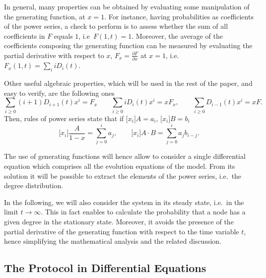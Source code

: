 \documentclass[a4paper,twosided]{article}
\begin{document}
In general, many properties can be obtained by evaluating some manipulation of the generating function, at $x=1$. For instance, having probabilities as coefficients of the power series, a check to perform is to assess whether the sum of all coefficients in $F$ equals $1$, i.e~$F(1,t) = 1$. Moreover, the average of the coefficients composing the generating function can be measured by evaluating the partial derivative with respect to $x$, $F_x = \frac{\partial F}{\partial x}$ at $x=1$, i.e.~$F_x(1,t) = \sum_i i D_i(t)$.

Other useful algebraic properties, which will be used in the rest of the paper, and easy to verify, are the following ones
\begin{equation}
\sum_{i\geq 0}(i+1) D_{i+1}(t) x^i= F_x \qquad \sum_{i\geq 0} i D_i(t) x^i = x F_x, \qquad
\sum_{i \geq 0} D_{i-1}(t) x^i = x F.
\label{eq:genfun_prop}
\end{equation}
Then, rules of power series state that if $\big[x_i]A = a_i$, $\big[x_i]B = b_i$
\begin{equation}\big[x_i] \frac{A}{1-x} = \sum_{j=0}^i a_j,\qquad \big[x_i] A \cdotp B = \sum_{j=0}^i a_j b_{i-j}.
\label{eq:rules_p_series}
\end{equation}

The use of generating functions will hence allow to consider a single differential equation which comprises all the evolution equations of the model. From its solution it will be possible to extract the elements of the power series, i.e.~the degree distribution.

In the following, we will also consider the system in its steady state, i.e.~in the limit $t\rightarrow \infty$. This in fact enables to calculate the probability that a node has a given degree in the stationary state. Moreover, it avoids the presence of the partial derivative of the generating function with respect to the time variable $t$, hence simplifying the mathematical analysis and the related discussion.

\subsection{The Protocol in Differential Equations}
\end{document}
